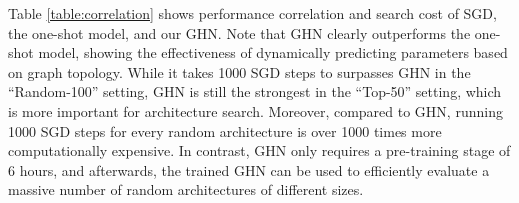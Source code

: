 Table \ref{table:correlation} shows performance correlation and search cost of SGD, the one-shot
model, and our GHN. Note that GHN clearly outperforms the one-shot model, showing the effectiveness
of dynamically predicting parameters based on graph topology. While it takes 1000 SGD steps to
surpasses GHN in the ``Random-100'' setting, GHN is still the strongest in the ``Top-50'' setting,
which is more important for architecture search. Moreover, compared to GHN, running 1000 SGD steps
for every random architecture is over 1000 times more computationally expensive. In contrast, GHN
only requires a pre-training stage of 6 hours, and afterwards, the trained GHN can be used to
efficiently evaluate a massive number of random architectures of different sizes.